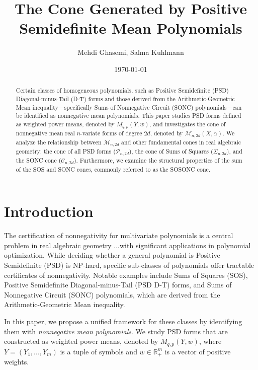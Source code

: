 \documentclass{article}
\title{The Cone Generated by Positive Semidefinite Mean Polynomials}
\author{Mehdi Ghasemi, Salma Kuhlmann}
\date{\today}
\begin{document}
\maketitle

\begin{abstract}
Certain classes of homogeneous polynomials, such as Positive Semidefinite (PSD) Diagonal-minus-Tail (D-T) 
forms and those derived from the Arithmetic-Geometric Mean inequality—specifically Sums of 
Nonnegative Circuit (SONC) polynomials—can be identified as nonnegative mean polynomials. 
This paper studies PSD forms defined as weighted power means, denoted by $M_{q,p}(Y,w)$, and investigates 
the cone of nonnegative mean real $n$-variate forms of degree $2d$, denoted by $\mathcal{M}_{n,2d}(X,\alpha)$. 
We analyze the relationship between $\mathcal{M}_{n,2d}$ and other fundamental cones in real algebraic geometry: 
the cone of all PSD forms ($\mathcal{P}_{n,2d}$), the cone of Sums of Squares ($\Sigma_{n,2d}$), and the SONC 
cone ($\mathcal{C}_{n,2d}$). Furthermore, we examine the structural properties of the sum of the SOS and SONC 
cones, commonly referred to as the SOSONC cone.
\end{abstract}

\section{Introduction}\label{s01}
The certification of nonnegativity for multivariate polynomials is a central problem in real algebraic geometry 
...with significant applications in polynomial optimization. While deciding whether a general polynomial is 
Positive Semidefinite (PSD) is NP-hard, specific sub-classes of polynomials offer tractable certificates of 
nonnegativity. Notable examples include Sums of Squares (SOS), Positive Semidefinite 
Diagonal-minus-Tail (PSD D-T) forms, and Sums of Nonnegative Circuit (SONC) polynomials, which are derived 
from the Arithmetic-Geometric Mean inequality.

In this paper, we propose a unified framework for these classes by identifying them with
\textit{nonnegative mean polynomials}. We study PSD forms that are constructed as weighted power means,
denoted by $M_{q,p}(Y,w)$, where $Y = (Y_{1},...,Y_{m})$ is a tuple of symbols and $w \in \mathbb{R}_{+}^{m}$ 
is a vector of positive weights.
\end{document}
